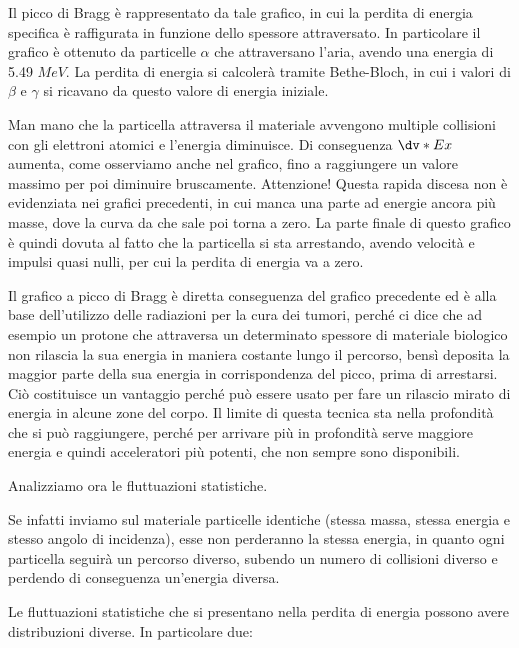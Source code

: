 Il picco di Bragg è rappresentato da tale grafico, in cui la perdita di energia specifica è raffigurata in funzione dello spessore attraversato. In particolare il grafico è ottenuto da particelle $\alpha$ che attraversano l'aria, avendo una energia di 5.49 $MeV$. La perdita di energia si calcolerà tramite Bethe-Bloch, in cui i valori di $\beta$ e $\gamma$ si ricavano da questo valore di energia iniziale. 

Man mano che la particella attraversa il materiale avvengono multiple collisioni con gli elettroni atomici e l'energia diminuisce. Di conseguenza $\dv*{E}{x}$ aumenta, come osserviamo anche nel grafico, fino a raggiungere un valore massimo per poi diminuire bruscamente. Attenzione! Questa rapida discesa non è evidenziata nei grafici precedenti, in cui manca una parte ad energie ancora più masse, dove la curva da che sale poi torna a zero. La parte finale di questo grafico è quindi dovuta al fatto che la particella si sta arrestando, avendo velocità e impulsi quasi nulli, per cui la perdita di energia va a zero.

Il grafico a picco di Bragg è diretta conseguenza del grafico precedente ed è alla base dell'utilizzo delle radiazioni per la cura dei tumori, perché ci dice che ad esempio un protone che attraversa un determinato spessore di materiale biologico non rilascia la sua energia in maniera costante lungo il percorso, bensì deposita la maggior parte della sua energia in corrispondenza del picco, prima di arrestarsi. Ciò costituisce un vantaggio perché può essere usato per fare un rilascio mirato di energia in alcune zone del corpo. Il limite di questa tecnica sta nella profondità che si può raggiungere, perché per arrivare più in profondità serve maggiore energia e quindi acceleratori più potenti, che non sempre sono disponibili.

Analizziamo ora le fluttuazioni statistiche.

Se infatti inviamo sul materiale particelle identiche (stessa massa, stessa energia e stesso angolo di incidenza), esse non perderanno la stessa energia, in quanto ogni particella seguirà un percorso diverso, subendo un numero di collisioni diverso e perdendo di conseguenza un'energia diversa.

Le fluttuazioni statistiche che si presentano nella perdita di energia possono avere distribuzioni diverse. In particolare due:

